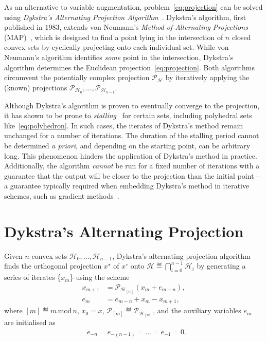 \documentclass[hidelinks]{article}
\begin{document}
As an alternative to variable augmentation, problem~\eqref{eq:projection} can be solved using \emph{Dykstra's Alternating Projection Algorithm}~\cite{DYKSTRA}. Dykstra's algorithm, first published in 1983, extends von Neumann's \emph{Method of Alternating Projections} (MAP)~\cite{NEUMANN}, which is designed to find a point lying in the intersection of $n$ closed convex sets by cyclically projecting onto each individual set. While von Neumann's algorithm identifies \emph{some} point in the intersection, Dykstra's algorithm determines the Euclidean projection~\eqref{eq:projection}. Both algorithms circumvent the potentially complex projection $\mathcal{P}_\mathcal{H}$ by iteratively applying the (known) projections $\mathcal{P}_{\mathcal{H}_0},\dots,\mathcal{P}_{\mathcal{H}_{n-1}}$. 

Although Dykstra's algorithm is proven to eventually converge to the projection, it has shown to be prone to \emph{stalling}~\cite{DYKSTRASTALLING} for certain sets, including polyhedral sets like~\eqref{eq:polyhedron}. In such cases, the iterates of Dykstra's method remain unchanged for a number of iterations. The duration of the stalling period cannot be determined \emph{a priori}, and depending on the starting point, can be arbitrary long. This phenomenon hinders the application of Dykstra's method in practice. Additionally, the algorithm \emph{cannot} be run for a fixed number of iterations with a guarantee that the output will be closer to the projection than the initial point -- a guarantee typically required when embedding Dykstra's method in iterative schemes, such as gradient methods~\cite{FGMPROJECTION}.

\section{Dykstra's Alternating Projection}\label{sec: dykstra}

Given $n$ convex sets $\mathcal{H}_0,\dots,\mathcal{H}_{n-1}$, Dykstra's alternating projection algorithm~\cite{DYKSTRAPERKINS} finds the orthogonal projection $x^\star$ of $x^\circ$ onto $\mathcal{H}\eqdef{\bigcap}_{i=0}^{n-1} \mathcal{H}_i$ by generating a series of iterates \{$x_{m}$\} using the scheme
\begin{subequations}\label{eq:dykstra}
\begin{align}
x_{m+1}&=\mathcal{P}_{\mathcal{H}_{[m]}}\left(x_{m}+e_{m-n}\right),\label{eq:dykstra:proj}\\
e_m&=e_{m-n}+x_{m}-x_{m+1}\label{eq:dykstra:error},
\end{align}
\end{subequations}
where $[m]\eqdef m \, \text{mod} \, n$, $x_0=x$, $\mathcal{P}_{[m]}\eqdef\mathcal{P}_{\mathcal{H}_{[m]}}$, and the auxiliary variables $e_m$ are initialised as
\begin{align}\label{eq:initial error}
&e_{-n} = e_{-(n-1)} = ... = e_{-1} = 0.
\end{align}
\end{document}
